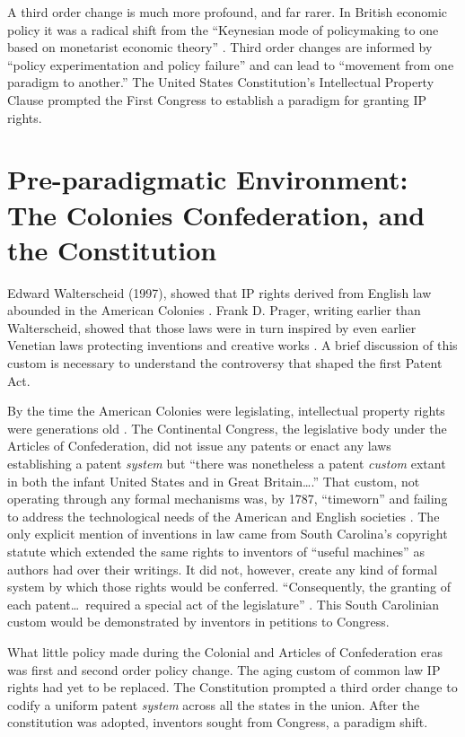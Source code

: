 \documentclass[12pt,letterpaper]{article}
\begin{document}
{A third order change is much more profound, and far rarer. In British economic policy it was a radical shift from the ``Keynesian mode of policymaking to one based on monetarist economic theory'' \autocite{Hall1993}. Third order changes are informed by ``policy experimentation and policy failure'' and can lead to ``movement from one paradigm to another.'' The United States Constitution's Intellectual Property Clause prompted the First Congress to establish a paradigm for granting IP rights.

\section{Pre-paradigmatic Environment: The Colonies Confederation, and the Constitution}

Edward Walterscheid (1997), showed that IP rights derived from English law abounded in the American Colonies \autocite{Walterscheid1997}. Frank D. Prager, writing earlier than Walterscheid, showed that those laws were in turn inspired by even earlier Venetian laws protecting inventions and creative works \autocite{Prager1944}. A brief discussion of this custom is necessary to understand the controversy that shaped the first Patent Act.

By the time the American Colonies were legislating, intellectual property rights were generations old \autocite{Prager1944}. The Continental Congress, the legislative body under the Articles of Confederation, did not issue any patents or enact any laws establishing a patent \emph{system} but ``there was nonetheless a patent \emph{custom} extant in both the infant United States and in Great Britain\ldots.'' That custom, not operating through any formal mechanisms was, by 1787, ``timeworn'' and failing to address the technological needs of the American and English societies \autocite[emphasis added]{Walterscheid1997}. The only explicit mention of inventions in law came from South Carolina's copyright statute which extended the same rights to inventors of ``useful machines'' as authors had over their writings. It did not, however, create any kind of formal system by which those rights would be conferred. ``Consequently, the granting of each patent\ldots~required a special act of the legislature'' \autocite{Walterscheid1997, Prager1944}. This South Carolinian custom would be demonstrated by inventors in petitions to Congress.

What little policy made during the Colonial and Articles of Confederation eras was first and second order policy change. The aging custom of common law IP rights had yet to be replaced. The Constitution prompted a third order change to codify a uniform patent \emph{system} across all the states in the union. After the constitution was adopted, inventors sought from Congress, a paradigm shift.

}
\end{document}
